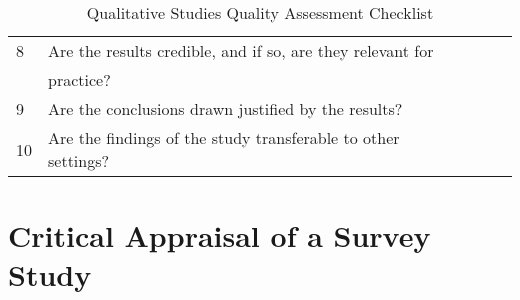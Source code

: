 \begin{table}[H]
\begin{center}
{\begin{tabular}{|l||l|l|l|l|}
                        \hline
                        8  & Are the results credible, and if so, are they relevant for       &&& \\
                           & practice?                                                        &&& \\
                        \hline
                        9  & Are the conclusions drawn justified by the results?              &&& \\
                        \hline
                        10 & Are the findings of the study transferable to other settings?    &&& \\
                        \hline
                \end{tabular}}
        \end{center}
        \caption{Qualitative Studies Quality Assessment Checklist}
        \label{table:qualitativeStudy}
\end{table}
    

\section*{Critical Appraisal of a Survey Study}


